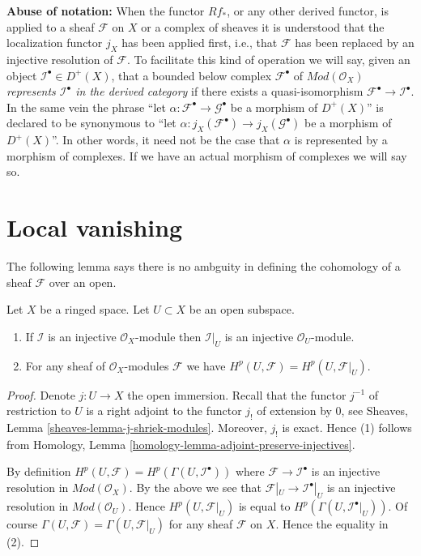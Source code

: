 \medskip\noindent
{\bf Abuse of notation:} When the functor $Rf_*$, or any other
derived functor, is applied to a sheaf $\mathcal{F}$ on $X$ or a complex
of sheaves it is understood that the localization functor $j_X$ has
been applied first, i.e., that $\mathcal{F}$ has been replaced by an
injective resolution of $\mathcal{F}$. To facilitate this kind of
operation we will say, given an object $\mathcal{I}^\bullet \in D^{+}(X)$,
that a bounded below complex $\mathcal{F}^\bullet$ of
$\textit{Mod}(\mathcal{O}_X)$
{\it represents $\mathcal{I}^\bullet$ in the derived category}
if there exists a quasi-isomorphism
$\mathcal{F}^\bullet \to \mathcal{I}^\bullet$. In the same vein the phrase
``let $\alpha : \mathcal{F}^\bullet \to \mathcal{G}^\bullet$ be
a morphism of $D^{+}(X)$'' is declared to be synonymous to
``let $\alpha : j_X(\mathcal{F}^\bullet) \to j_X(\mathcal{G}^\bullet)$
be a morphism of $D^{+}(X)$''. In other words, it need not be the
case that $\alpha$ is represented by a morphism of complexes. If we have
an actual morphism of complexes we will say so.








\section{Local vanishing}
\label{section-local-vanishing}

\noindent
The following lemma says there is no ambguity in defining the cohomology
of a sheaf $\mathcal{F}$ over an open.

\begin{lemma}
\label{lemma-cohomology-of-open}
Let $X$ be a ringed space.
Let $U \subset X$ be an open subspace.
\begin{enumerate}
\item If $\mathcal{I}$ is an injective $\mathcal{O}_X$-module
then $\mathcal{I}|_U$ is an injective $\mathcal{O}_U$-module.
\item For any sheaf of $\mathcal{O}_X$-modules $\mathcal{F}$ we have
$H^p(U, \mathcal{F}) = H^p(U, \mathcal{F}|_U)$.
\end{enumerate}
\end{lemma}

\begin{proof}
Denote $j : U \to X$ the open immersion.
Recall that the functor $j^{-1}$ of restriction to $U$ is a right adjoint
to the functor $j_!$ of extension by $0$, see
Sheaves, Lemma \ref{sheaves-lemma-j-shriek-modules}.
Moreover, $j_!$ is exact. Hence (1) follows from
Homology, Lemma \ref{homology-lemma-adjoint-preserve-injectives}.

\medskip\noindent
By definition $H^p(U, \mathcal{F}) = H^p(\Gamma(U, \mathcal{I}^\bullet))$
where $\mathcal{F} \to \mathcal{I}^\bullet$ is an injective resolution
in $\textit{Mod}(\mathcal{O}_X)$.
By the above we see that $\mathcal{F}|_U \to \mathcal{I}^\bullet|_U$
is an injective resolution in $\textit{Mod}(\mathcal{O}_U)$.
Hence $H^p(U, \mathcal{F}|_U)$ is equal to
$H^p(\Gamma(U, \mathcal{I}^\bullet|_U))$.
Of course $\Gamma(U, \mathcal{F}) = \Gamma(U, \mathcal{F}|_U)$ for
any sheaf $\mathcal{F}$ on $X$.
Hence the equality
in (2).
\end{proof}

